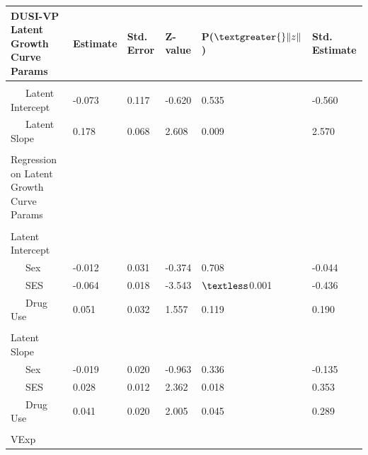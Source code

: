 \documentclass[utf8]{article}
\begin{document}
\begin{table}[h!]
\begin{tabular}{llllll}
DUSI-VP Latent Growth Curve Params                    & Estimate & Std. Error & Z-value & P($\textgreater{}\|z\|$) & Std. Estimate \\ \hline \\
\ \ \ Latent Intercept               & -0.073   & 0.117      & -0.620  & 0.535                    & -0.560  \\
\ \ \ Latent Slope                   & 0.178    & 0.068      & 2.608   & 0.009                    & 2.570  \\ \\
Regression on Latent Growth Curve Params  &          &            &         &                          &         \\ \hline \\ 
Latent Intercept               &          &            &         &                          &         \\
\ \ \ Sex                            & -0.012   & 0.031      & -0.374  & 0.708                    & -0.044  \\
\ \ \ SES                            & -0.064   & 0.018      & -3.543  & $\textless$0.001                    & -0.436  \\
\ \ \ Drug Use                         & 0.051    & 0.032      & 1.557   & 0.119                    & 0.190   \\
                               &          &            &         &                          &         \\
Latent Slope                   &          &            &         &                          &         \\
\ \ \ Sex                            & -0.019   & 0.020      & -0.963  & 0.336                    & -0.135  \\
\ \ \ SES                            & 0.028    & 0.012      & 2.362   & 0.018                    & 0.353   \\
\ \ \ Drug Use                         & 0.041    & 0.020      & 2.005   & 0.045                    & 0.289   \\
                               &          &            &         &                          &         \\
VExp                           &          &            &         &                          &         \\

\end{tabular}
\end{table}
\end{document}

